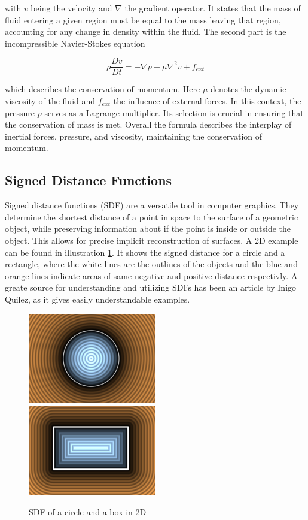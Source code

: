 \documentclass[intern]{cgMA}
\begin{document}
    with $v$ being the velocity and $\nabla$ the gradient operator. It states that the mass of fluid entering a given region must be equal to the mass leaving that region, accounting for any change in density within the fluid. The second part is the incompressible Navier-Stokes equation

    \begin{equation}
        \rho \frac{D v}{D t} = -\nabla p + \mu \nabla^2 v + f_{ext}
    \end{equation}

    which describes the conservation of momentum. Here $\mu$ denotes the dynamic viscosity of the fluid and $f_{ext}$ the influence of external forces. In this context, the pressure $p$ serves as a Lagrange multiplier. Its selection is crucial in ensuring that the conservation of mass is met. Overall the formula describes the interplay of inertial forces, pressure, and viscosity, maintaining the conservation of momentum.

    \subsection{Signed Distance Functions}
    Signed distance functions (SDF) are a versatile tool in computer graphics. They determine the shortest distance of a point in space to the surface of a geometric object, while preserving information about if the point is inside or outside the object. This allows for precise implicit reconstruction of surfaces. A 2D example can be found in illustration \ref{fig:sdf}. It shows the signed distance for a circle and a rectangle, where the white lines are the outlines of the objects and the blue and orange lines indicate areas of same negative and positive distance respectivly. A greate source for understanding and utilizing SDFs has been an article by Inigo Quilez, as it gives easily understandable examples. \cite{iquilezles}

    \begin{figure}[H]
        \includegraphics[width=0.5\textwidth]{figures/gfx00.png}
        \includegraphics[width=0.5\textwidth]{figures/gfx02.png}
        \caption[SDF of a circle and a box in 2D \cite{iquilezles2}]{SDF of a circle and a box in 2D}
        \label{fig:sdf}
    \end{figure}
\end{document}

